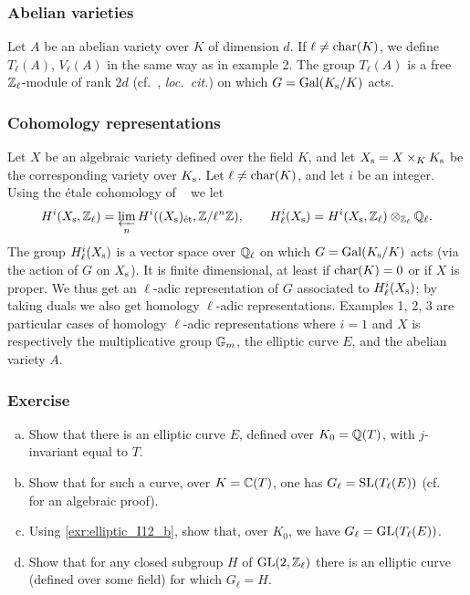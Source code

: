 \subsubsection{Abelian varieties}\label{sec:I_123}
Let $A$ be an abelian variety over $K$ of dimension $d$. If $\ell \ne
\operatorname{char}(K)$, we define $T_\ell(A)$, $V_\ell(A)$ in the same way as in example 2.
The group $T_\ell(A)$ is a free $\mathbb{Z}_\ell$-module of rank $2d$ (cf.\ \cite{12},
\textit{loc.\ cit.}) on which $G = \operatorname{Gal}(K_{\mathrm{s}}/K)$ acts.

\subsubsection{Cohomology representations}\label{sec:I_124}
Let $X$ be an algebraic variety defined over the field $K$, and let $X_{\mathrm{s}} =
X \times_K K_{\mathrm{s}}$ be the corresponding variety over $K_{\mathrm{s}}$. Let $\ell
\ne \operatorname{char}(K)$, and let $i$ be an integer. Using the étale cohomology of
\citeauthor{3}~\cite{3} we let
\[
	H^i(\sepcl X, \Z_\ell) = \invlim_n H^i\big( (\sepcl X)_{\text{ét}},
	\Z/\ell^n\Z \big),
	\qquad H^i_\ell(\sepcl X) = H^i(\sepcl X, \Z_\ell) \otimes_{\Z_\ell}
	\Q_\ell.
\]
\dpage
The group $H^i_\ell(X_{\mathrm{s}})$ is a vector space over $\mathbb{Q}_\ell$ on which $G =
\operatorname{Gal}(K_{\mathrm{s}}/K)$ acts (via the action of $G$ on $X_{\mathrm{s}}$). It is finite
dimensional, at least if $\operatorname{char}(K) = 0$ or if $X$ is proper. We thus get an
$\ell$-adic representation of $G$ associated to $H^i_\ell(X_{\mathrm{s}})$; by taking
duals we also get homology $\ell$-adic representations.
Examples 1, 2, 3 are particular cases of homology $\ell$-adic representations
where $i = 1$ and $X$ is respectively the multiplicative group $\mathbb{G}_m$, the
elliptic curve $E$, and the abelian variety $A$.

\subsubsection*{Exercise}
\begin{enumerate}[(a)]
	\item Show that there is an elliptic curve $E$, defined over $K_0 =
		\mathbb{Q}(T)$, with $j$-invariant equal to $T$.
	\item\label{exr:elliptic_I12_b}
		Show that for such a curve, over $K = \mathbb{C}(T)$, one has $G_\ell =
		\operatorname{SL}(T_\ell(E))$ (cf.\ \citeauthor{10}~\cite{10} for an
		algebraic proof).
	\item Using \ref{exr:elliptic_I12_b}, show that, over $K_0$, we have
		$G_\ell = \operatorname{GL}(T_\ell(E))$.
	\item Show that for any closed subgroup $H$ of $\operatorname{GL}(2, \mathbb{Z}_\ell)$ there
		is an elliptic curve (defined over some field) for which
		$G_\ell = H$.
\end{enumerate}

